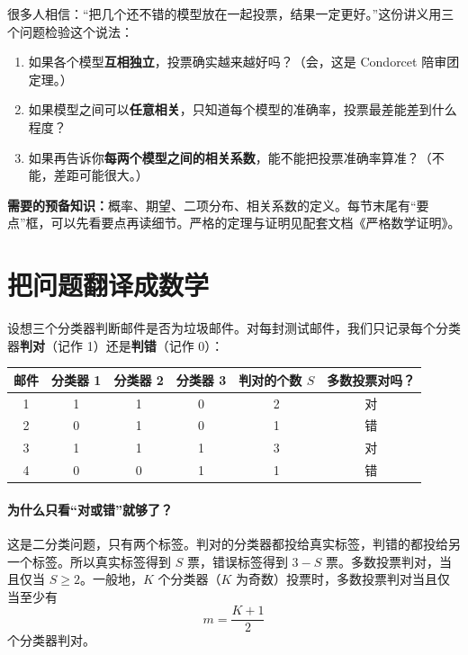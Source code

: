 \documentclass[11pt]{article}
\begin{document}

\begin{keybox}[title=这份讲义讲什么]
很多人相信：“把几个还不错的模型放在一起投票，结果一定更好。”这份讲义用三个问题检验这个说法：
\begin{enumerate}[leftmargin=1.6em]
\item 如果各个模型\textbf{互相独立}，投票确实越来越好吗？（会，这是 Condorcet 陪审团定理。）
\item 如果模型之间可以\textbf{任意相关}，只知道每个模型的准确率，投票最差能差到什么程度？
\item 如果再告诉你\textbf{每两个模型之间的相关系数}，能不能把投票准确率算准？（不能，差距可能很大。）
\end{enumerate}
\textbf{需要的预备知识：}概率、期望、二项分布、相关系数的定义。每节末尾有“要点”框，可以先看要点再读细节。严格的定理与证明见配套文档《严格数学证明》。
\end{keybox}

\tableofcontents

\section{把问题翻译成数学}

设想三个分类器判断邮件是否为垃圾邮件。对每封测试邮件，我们只记录每个分类器\textbf{判对}（记作 1）还是\textbf{判错}（记作 0）：

\begin{center}
\begin{tabular}{cccc|c|c}
\toprule
邮件 & 分类器 1 & 分类器 2 & 分类器 3 & 判对的个数 $S$ & 多数投票对吗？\\
\midrule
1 & 1 & 1 & 0 & 2 & 对\\
2 & 0 & 1 & 0 & 1 & 错\\
3 & 1 & 1 & 1 & 3 & 对\\
4 & 0 & 0 & 1 & 1 & 错\\
\bottomrule
\end{tabular}
\end{center}

\paragraph{为什么只看“对或错”就够了？}这是二分类问题，只有两个标签。判对的分类器都投给真实标签，判错的都投给另一个标签。所以真实标签得到 $S$ 票，错误标签得到 $3-S$ 票。多数投票判对，当且仅当 $S\ge2$。一般地，$K$ 个分类器（$K$ 为奇数）投票时，多数投票判对当且仅当至少有
\[
m=\frac{K+1}{2}
\]
个分类器判对。
\end{document}
